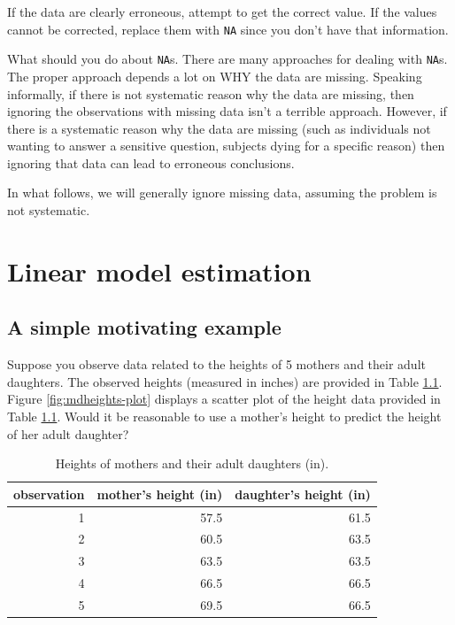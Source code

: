 \documentclass[
]{book}
\theoremstyle{definition}
\theoremstyle{definition}
\theoremstyle{definition}
\theoremstyle{definition}
\theoremstyle{remark}
\begin{document}
If the data are clearly erroneous, attempt to get the correct value. If the values cannot be corrected, replace them with \texttt{NA} since you don't have that information.

What should you do about \texttt{NA}s. There are many approaches for dealing with \texttt{NA}s. The proper approach depends a lot on WHY the data are missing. Speaking informally, if there is not systematic reason why the data are missing, then ignoring the observations with missing data isn't a terrible approach. However, if there is a systematic reason why the data are missing (such as individuals not wanting to answer a sensitive question, subjects dying for a specific reason) then ignoring that data can lead to erroneous conclusions.

In what follows, we will generally ignore missing data, assuming the problem is not systematic.

\hypertarget{linear-model-estimation}{%
\chapter{Linear model estimation}\label{linear-model-estimation}}

\hypertarget{a-simple-motivating-example}{%
\section{A simple motivating example}\label{a-simple-motivating-example}}

Suppose you observe data related to the heights of 5 mothers and their adult daughters. The observed heights (measured in inches) are provided in Table \ref{tab:mdheights}. Figure \ref{fig:mdheights-plot} displays a scatter plot of the height data provided in Table \ref{tab:mdheights}. Would it be reasonable to use a mother's height to predict the height of her adult daughter?

\begin{table}

\caption{\label{tab:mdheights}Heights of mothers and their adult daughters (in).}
\centering
\begin{tabular}[t]{rrr}
\toprule
observation & mother's height (in) & daughter's height (in)\\
\midrule
1 & 57.5 & 61.5\\
2 & 60.5 & 63.5\\
3 & 63.5 & 63.5\\
4 & 66.5 & 66.5\\
5 & 69.5 & 66.5\\
\bottomrule
\end{tabular}
\end{table}
\end{document}
